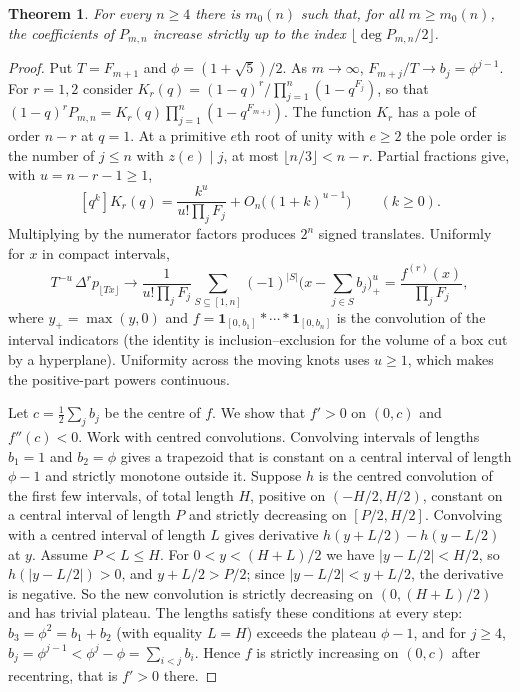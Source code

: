 \documentclass[11pt,a4paper]{article}
\newtheorem{theorem}{Theorem}[section]
\theoremstyle{definition}\newtheorem{definition}[theorem]{Definition}
\theoremstyle{remark}\newtheorem{remark}[theorem]{Remark}\newtheorem{example}[theorem]{Example}
\numberwithin{equation}{section}
\begin{document}
\begin{theorem}\label{thm:fixed}
For every $n\ge4$ there is $m_0(n)$ such that, for all $m\ge m_0(n)$, the coefficients of $P_{m,n}$ increase strictly up to the index $\lfloor\deg P_{m,n}/2\rfloor$.
\end{theorem}
\begin{proof}
Put $T=F_{m+1}$ and $\phi=(1+\sqrt5)/2$. As $m\to\infty$, $F_{m+j}/T\to b_j=\phi^{j-1}$. For $r=1,2$ consider $K_r(q)=(1-q)^r/\prod_{j=1}^n(1-q^{F_j})$, so that $(1-q)^rP_{m,n}=K_r(q)\prod_{j=1}^n(1-q^{F_{m+j}})$. The function $K_r$ has a pole of order $n-r$ at $q=1$. At a primitive $e$th root of unity with $e\ge2$ the pole order is the number of $j\le n$ with $z(e)\mid j$, at most $\lfloor n/3\rfloor<n-r$. Partial fractions give, with $u=n-r-1\ge1$,
\[
 [q^k]K_r(q)=\frac{k^{u}}{u!\prod_jF_j}+O_n\big((1+k)^{u-1}\big)\qquad(k\ge0).
\]
Multiplying by the numerator factors produces $2^n$ signed translates. Uniformly for $x$ in compact intervals,
\[
 T^{-u}\,\Delta^rp_{\lfloor Tx\rfloor}\longrightarrow\frac1{u!\prod_jF_j}\sum_{S\subseteq[1,n]}(-1)^{|S|}\Big(x-\sum_{j\in S}b_j\Big)_+^{u}=\frac{f^{(r)}(x)}{\prod_jF_j},
\]
where $y_+=\max(y,0)$ and $f=\mathbf1_{[0,b_1]}*\cdots*\mathbf1_{[0,b_n]}$ is the convolution of the interval indicators (the identity is inclusion--exclusion for the volume of a box cut by a hyperplane). Uniformity across the moving knots uses $u\ge1$, which makes the positive-part powers continuous.

Let $c=\frac12\sum_jb_j$ be the centre of $f$. We show that $f'>0$ on $(0,c)$ and $f''(c)<0$. Work with centred convolutions. Convolving intervals of lengths $b_1=1$ and $b_2=\phi$ gives a trapezoid that is constant on a central interval of length $\phi-1$ and strictly monotone outside it. Suppose $h$ is the centred convolution of the first few intervals, of total length $H$, positive on $(-H/2,H/2)$, constant on a central interval of length $P$ and strictly decreasing on $[P/2,H/2]$. Convolving with a centred interval of length $L$ gives derivative $h(y+L/2)-h(y-L/2)$ at $y$. Assume $P<L\le H$. For $0<y<(H+L)/2$ we have $|y-L/2|<H/2$, so $h(|y-L/2|)>0$, and $y+L/2>P/2$; since $|y-L/2|<y+L/2$, the derivative is negative. So the new convolution is strictly decreasing on $(0,(H+L)/2)$ and has trivial plateau. The lengths satisfy these conditions at every step: $b_3=\phi^2=b_1+b_2$ (with equality $L=H$) exceeds the plateau $\phi-1$, and for $j\ge4$, $b_j=\phi^{j-1}<\phi^j-\phi=\sum_{i<j}b_i$. Hence $f$ is strictly increasing on $(0,c)$ after recentring, that is $f'>0$ there.


\end{proof}
\end{document}
